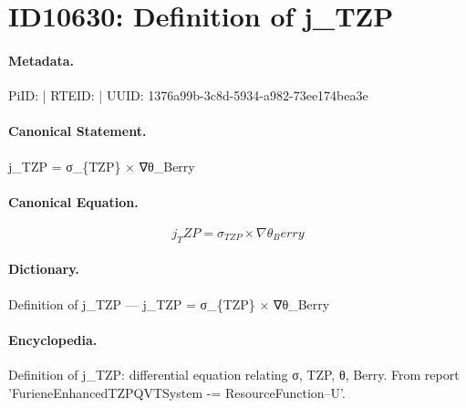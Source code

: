 \section*{ID10630: Definition of j\_TZP}
\paragraph{Metadata.}
PiID:  | RTEID:  | UUID: 1376a99b-3c8d-5934-a982-73ee174bea3e

\paragraph{Canonical Statement.}
j\_TZP = σ\_\{TZP\} × ∇θ\_Berry

\paragraph{Canonical Equation.}
\[
j_TZP = σ_{TZP} × ∇θ_Berry
\]

\paragraph{Dictionary.}
Definition of j\_TZP — j\_TZP = σ\_\{TZP\} × ∇θ\_Berry

\paragraph{Encyclopedia.}
Definition of j\_TZP: differential equation relating σ, TZP, θ, Berry. From report 'FurieneEnhancedTZPQVTSystem -= ResourceFunction--U'.
